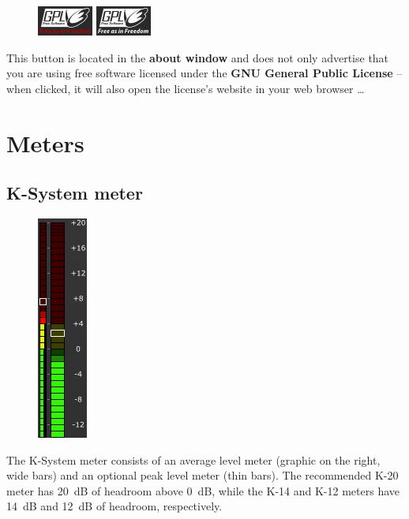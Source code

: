 \begin{figure}
  \includegraphics[scale=\screenshotscale,clip]{include/images/button_gpl_on.png}
  \newline \vspace{-0.9\baselineskip}
  \includegraphics[scale=\screenshotscale,clip]{include/images/button_gpl_off.png}
\end{figure}

This button is located in the \textbf{about window} and does not only
advertise that you are using free software licensed under the
\textbf{GNU General Public License} -- when clicked, it will also open
the license's website in your web browser \dots

\chapter{Meters}
\label{chap:meters}

\section{K-System meter}

\begin{figure}
  \includegraphics[scale=\screenshotscale,clip]{include/images/level_meter_combined.png}
\end{figure}

The K-System meter consists of an average level meter (graphic on the
right, wide bars) and an optional peak level meter (thin bars).  The
recommended K-20 meter has \SI{20}{\dB} of headroom above \SI{0}{\dB},
while the K-14 and K-12 meters have \SI{14}{\dB} and \SI{12}{\dB} of
headroom, respectively.

